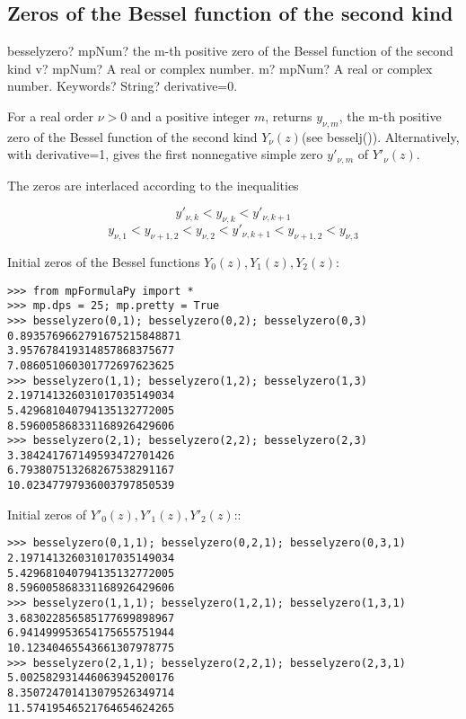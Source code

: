 \subsection{Zeros of the Bessel function of the second kind}

\begin{mpFunctionsExtract}
	\mpFunctionThree
	{besselyzero? mpNum? the m-th positive zero of the Bessel function of the second kind}
	{v? mpNum? A real or complex number.}
	{m? mpNum? A real or complex number.}	
	{Keywords? String? derivative=0.}	
\end{mpFunctionsExtract}

\vpara
For a real order $\nu > 0$ and a positive integer $m$, returns $y_{\nu, m}$, the m-th positive zero of the Bessel function of the second kind $Y_{\nu}(z)$(see besselj()). Alternatively, with derivative=1, gives the first nonnegative simple zero $y'_{\nu, m}$ of $Y'_{\nu}(z)$.

The zeros are interlaced according to the inequalities

\begin{equation}
y'_{\nu,k} < y_{\nu,k} < y'_{\nu,k+1}
\end{equation}
\begin{equation}
y_{\nu,1} < y_{\nu+1,2} < y_{\nu,2} < y'_{\nu,k+1} < y_{\nu+1,2} < y_{\nu,3}
\end{equation}

Initial zeros of the Bessel functions $Y_0(z), Y_1(z), Y_2(z)$:


\begin{lstlisting}
>>> from mpFormulaPy import *
>>> mp.dps = 25; mp.pretty = True
>>> besselyzero(0,1); besselyzero(0,2); besselyzero(0,3)
0.8935769662791675215848871
3.957678419314857868375677
7.086051060301772697623625
>>> besselyzero(1,1); besselyzero(1,2); besselyzero(1,3)
2.197141326031017035149034
5.429681040794135132772005
8.596005868331168926429606
>>> besselyzero(2,1); besselyzero(2,2); besselyzero(2,3)
3.384241767149593472701426
6.793807513268267538291167
10.02347797936003797850539
\end{lstlisting}

Initial zeros of $Y'_0(z), Y'_1(z), Y'_2(z)$::

\begin{lstlisting}
>>> besselyzero(0,1,1); besselyzero(0,2,1); besselyzero(0,3,1)
2.197141326031017035149034
5.429681040794135132772005
8.596005868331168926429606
>>> besselyzero(1,1,1); besselyzero(1,2,1); besselyzero(1,3,1)
3.683022856585177699898967
6.941499953654175655751944
10.12340465543661307978775
>>> besselyzero(2,1,1); besselyzero(2,2,1); besselyzero(2,3,1)
5.002582931446063945200176
8.350724701413079526349714
11.57419546521764654624265
\end{lstlisting}

